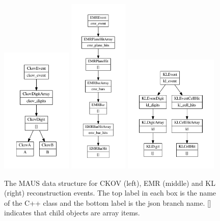 \documentclass{JINST}
\begin{document}
\begin{figure}[ptb]
\centering
\includegraphics[width=0.3\textwidth]{figs/ckov_datastructure.pdf}
\includegraphics[width=0.25\textwidth]{figs/emr_datastructure.pdf}
\includegraphics[width=0.4\textwidth]{figs/kl_datastructure.pdf}
\caption{The MAUS data structure for CKOV (left), EMR (middle) and KL (right) reconstruction events. The top label in each box is the name of the C++ class and the bottom label is the json branch name. [] indicates that child objects are array items.}
\label{fig:datastructure-recon-ckov-emr-kl}
\end{figure}
\end{document}
